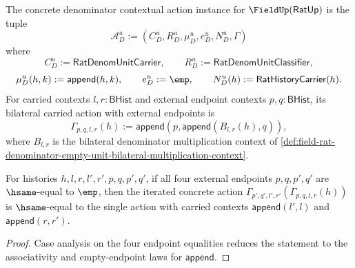 \begin{definition}
\label{def:ratup-fieldup-denominator-contextual-action-instance}
The concrete denominator contextual action instance for
$\FieldUp(\mathsf{RatUp})$ is the tuple
$$
\mathcal{A}_D^u:=(C_D^u,R_D^u,\mu_D^u,e_D^u,N_D^u,\Gamma)
$$
where
$$
C_D^u:=\mathsf{RatDenomUnitCarrier},\qquad
R_D^u:=\mathsf{RatDenomUnitClassifier},
$$
$$
\mu_D^u(h,k):=\mathsf{append}(h,k),\qquad
e_D^u:=\emp,\qquad
N_D^u(h):=\mathsf{RatHistoryCarrier}(h).
$$
For carried contexts $l,r:\mathsf{BHist}$ and external endpoint contexts
$p,q:\mathsf{BHist}$, its bilateral carried action with external endpoints is
$$
\Gamma_{p,q,l,r}(h):=\mathsf{append}(p,\mathsf{append}(B_{l,r}(h),q)),
$$
where $B_{l,r}$ is the bilateral denominator multiplication context of
\autoref{def:field-rat-denominator-empty-unit-bilateral-multiplication-context}.
\end{definition}

\begin{theorem}
\label{thm:rat-denom-unit-contextual-action-empty-endpoint-composition}
For histories \(h,l,r,l',r',p,q,p',q'\), if all four external endpoints
\(p,q,p',q'\) are \(\hsame\)-equal to \(\emp\), then the iterated concrete
action
\(\Gamma_{p',q',l',r'}(\Gamma_{p,q,l,r}(h))\) is \(\hsame\)-equal to the
single action with carried contexts \(\mathsf{append}(l',l)\) and
\(\mathsf{append}(r,r')\).
\end{theorem}
\begin{proof}
Case analysis on the four endpoint equalities reduces the statement to the
associativity and empty-endpoint laws for \(\mathsf{append}\).
\end{proof}

